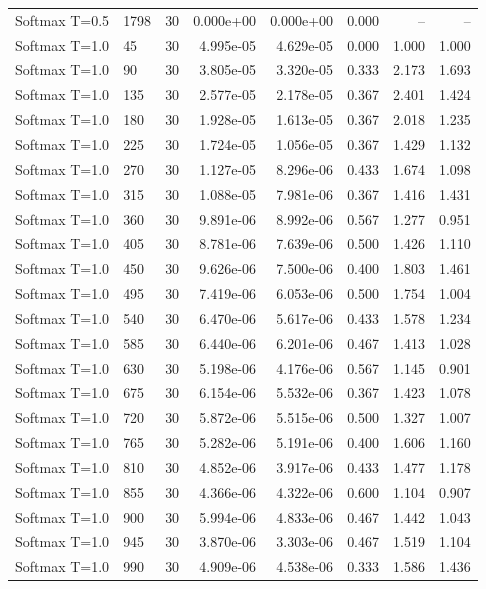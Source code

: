 \begin{scriptsize}
\begin{longtable}{llrrrrrr}
Softmax T=0.5 & 1798 & 30 & 0.000e+00 & 0.000e+00 & 0.000 & -- & -- \\
Softmax T=1.0 & 45 & 30 & 4.995e-05 & 4.629e-05 & 0.000 & 1.000 & 1.000 \\
Softmax T=1.0 & 90 & 30 & 3.805e-05 & 3.320e-05 & 0.333 & 2.173 & 1.693 \\
Softmax T=1.0 & 135 & 30 & 2.577e-05 & 2.178e-05 & 0.367 & 2.401 & 1.424 \\
Softmax T=1.0 & 180 & 30 & 1.928e-05 & 1.613e-05 & 0.367 & 2.018 & 1.235 \\
Softmax T=1.0 & 225 & 30 & 1.724e-05 & 1.056e-05 & 0.367 & 1.429 & 1.132 \\
Softmax T=1.0 & 270 & 30 & 1.127e-05 & 8.296e-06 & 0.433 & 1.674 & 1.098 \\
Softmax T=1.0 & 315 & 30 & 1.088e-05 & 7.981e-06 & 0.367 & 1.416 & 1.431 \\
Softmax T=1.0 & 360 & 30 & 9.891e-06 & 8.992e-06 & 0.567 & 1.277 & 0.951 \\
Softmax T=1.0 & 405 & 30 & 8.781e-06 & 7.639e-06 & 0.500 & 1.426 & 1.110 \\
Softmax T=1.0 & 450 & 30 & 9.626e-06 & 7.500e-06 & 0.400 & 1.803 & 1.461 \\
Softmax T=1.0 & 495 & 30 & 7.419e-06 & 6.053e-06 & 0.500 & 1.754 & 1.004 \\
Softmax T=1.0 & 540 & 30 & 6.470e-06 & 5.617e-06 & 0.433 & 1.578 & 1.234 \\
Softmax T=1.0 & 585 & 30 & 6.440e-06 & 6.201e-06 & 0.467 & 1.413 & 1.028 \\
Softmax T=1.0 & 630 & 30 & 5.198e-06 & 4.176e-06 & 0.567 & 1.145 & 0.901 \\
Softmax T=1.0 & 675 & 30 & 6.154e-06 & 5.532e-06 & 0.367 & 1.423 & 1.078 \\
Softmax T=1.0 & 720 & 30 & 5.872e-06 & 5.515e-06 & 0.500 & 1.327 & 1.007 \\
Softmax T=1.0 & 765 & 30 & 5.282e-06 & 5.191e-06 & 0.400 & 1.606 & 1.160 \\
Softmax T=1.0 & 810 & 30 & 4.852e-06 & 3.917e-06 & 0.433 & 1.477 & 1.178 \\
Softmax T=1.0 & 855 & 30 & 4.366e-06 & 4.322e-06 & 0.600 & 1.104 & 0.907 \\
Softmax T=1.0 & 900 & 30 & 5.994e-06 & 4.833e-06 & 0.467 & 1.442 & 1.043 \\
Softmax T=1.0 & 945 & 30 & 3.870e-06 & 3.303e-06 & 0.467 & 1.519 & 1.104 \\
Softmax T=1.0 & 990 & 30 & 4.909e-06 & 4.538e-06 & 0.333 & 1.586 & 1.436 \\

\end{longtable}
\end{scriptsize}
